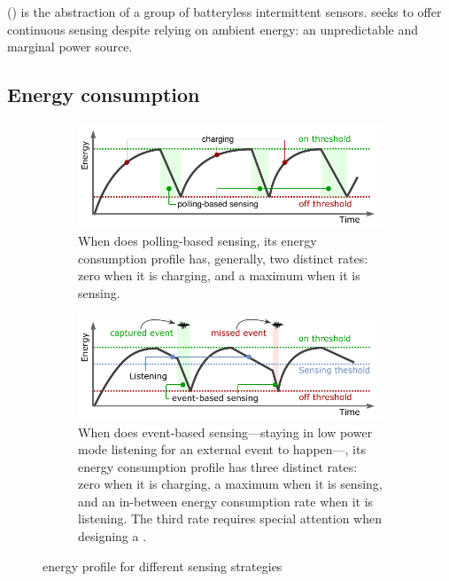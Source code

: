 \fullsys (\sys) is the abstraction of a group of batteryless intermittent sensors. \sys seeks to offer continuous sensing despite relying on ambient energy: an unpredictable and marginal power source. 

\subsection{Energy consumption}
%
\begin{figure}[t]
	\centering
		\begin{subfigure}{\columnwidth}
			\includegraphics[width=\columnwidth]{figures/PowerCycleIntermittentSystem}
			\caption{When \sys does polling-based sensing, its energy consumption profile has, generally, two distinct rates: zero when it is charging, and a maximum when it is sensing.}
			\label{fig:pollingBasedSensing}
	\end{subfigure}
	\begin{subfigure}{\columnwidth}
		\includegraphics[width=\columnwidth]{figures/PowerCycleIntermittentSensor}
		\caption{When \sys does event-based sensing---staying in low power mode listening for an external event to happen---, its energy consumption profile has three distinct rates: zero when it is charging, a maximum when it is sensing, and an in-between energy consumption rate when it is listening. The third rate requires special attention when designing a \sys.}
		\label{fig:eventBasedSensing}
\end{subfigure}
		\caption{\fullsys energy profile for different sensing strategies}
		\label{fig:cisPwrCycle}
\end{figure} 
